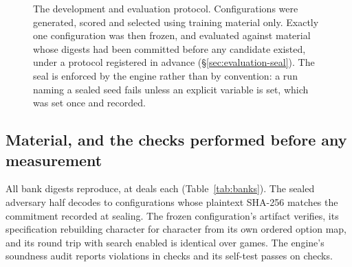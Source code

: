 \begin{figure}[!ht]
\caption{The development and evaluation protocol. Configurations were generated, scored and selected
using training material only. Exactly one configuration was then frozen, and evaluated against
material whose digests had been committed before any candidate existed, under a protocol registered in
advance (\S\ref{sec:evaluation-seal}). The seal is enforced by the engine rather than by convention:
a run naming a sealed seed fails unless an explicit variable is set, which was set once and recorded.}
\label{fig:protocol}
\end{figure}

\subsection{Material, and the checks performed before any measurement}
\label{sec:design-material}

All \vsevenBanks{} bank digests reproduce, at \vsevenBankDeals{} deals each (Table~\ref{tab:banks}). The sealed adversary half
decodes to \vsevenSealedRows{} configurations whose plaintext SHA-256 matches the commitment recorded
at sealing. The frozen configuration's artifact verifies, its specification rebuilding character for
character from its own ordered option map, and its round trip with search enabled is identical over
\vsevenRtwoaGames{} games. The engine's soundness audit reports \vsevenVerifyViolations{} violations
in \vsevenVerifyChecks{} checks and its self-test passes on \vsevenSelftestChecks{} checks.

\begin{table}[!ht]\centering
\caption{The deal banks. Each digest was recomputed before any cell was played, by folding the six
dealt hands and the dealer of every deal into a rolling hash without constructing a policy or playing
a game. The committed digests had been computed by a different build of the engine at sealing time,
so agreement is between two binaries as well as two dates.}
\label{tab:banks}
{\tabfont}
\end{table}

